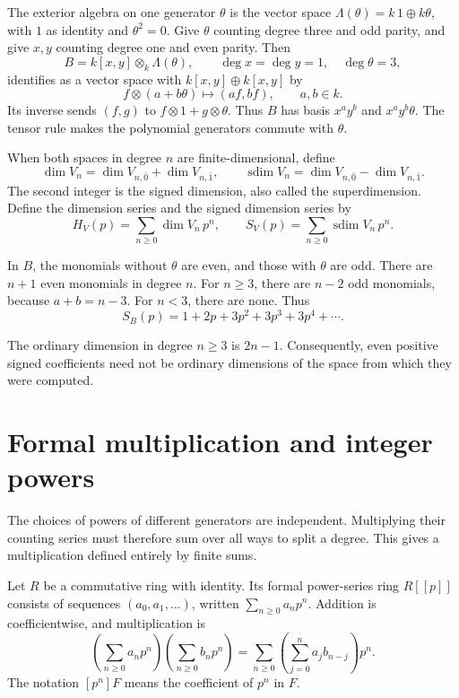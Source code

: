 The exterior algebra on one generator $\theta$ is the vector space
$\Lambda(\theta)=k\,1\oplus k\theta$, with $1$ as identity and
$\theta^2=0$. Give $\theta$ counting degree three and odd parity, and give
$x,y$ counting degree one and even parity. Then
\[
 B=k[x,y]\otimes_k\Lambda(\theta),
 \qquad \deg x=\deg y=1,\quad\deg\theta=3,
\]
identifies as a vector space with $k[x,y]\oplus k[x,y]$ by
\[
 f\otimes(a+b\theta)\longmapsto(af,bf),\qquad a,b\in k.
\]
Its inverse sends $(f,g)$ to $f\otimes1+g\otimes\theta$.
Thus $B$ has basis $x^a y^b$ and $x^a y^b\theta$.
The tensor rule makes the polynomial generators commute with $\theta$.

When both spaces in degree $n$ are finite-dimensional, define
\[
 \dim V_n=\dim V_{n,\bar0}+\dim V_{n,\bar1},
 \qquad
 \operatorname{sdim}V_n=\dim V_{n,\bar0}-\dim V_{n,\bar1}.
\]
The second integer is the signed dimension, also called the superdimension.
Define the dimension series and the signed dimension series by
\[
 H_V(p)=\sum_{n\geq0}\dim V_n\,p^n,
 \qquad
 S_V(p)=\sum_{n\geq0}\operatorname{sdim}V_n\,p^n.
\]

In $B$, the monomials without $\theta$ are even, and those with $\theta$ are
odd. There are $n+1$ even monomials in degree $n$.
For $n\geq3$, there are $n-2$ odd monomials, because $a+b=n-3$.
For $n<3$, there are none. Thus
\begin{equation}
 S_B(p)=1+2p+3p^2+3p^3+3p^4+\cdots.
 \label{eq:pc-count-example}
\end{equation}

The ordinary dimension in degree $n\geq3$ is $2n-1$.
Consequently, even positive signed coefficients need not be ordinary
dimensions of the space from which they were computed.

\section{Formal multiplication and integer powers}

The choices of powers of different generators are independent.
Multiplying their counting series must therefore sum over all ways to split
a degree. This gives a multiplication defined entirely by finite sums.

Let $R$ be a commutative ring with identity. Its formal power-series ring
$R[[p]]$ consists of sequences $(a_0,a_1,\ldots)$, written
$\sum_{n\geq0}a_np^n$. Addition is coefficientwise, and multiplication is
\[
 \left(\sum_{n\geq0}a_np^n\right)
 \left(\sum_{n\geq0}b_np^n\right)
 =\sum_{n\geq0}\left(\sum_{j=0}^n a_jb_{n-j}\right)p^n.
\]
The notation $[p^n]F$ means the coefficient of $p^n$ in $F$.

